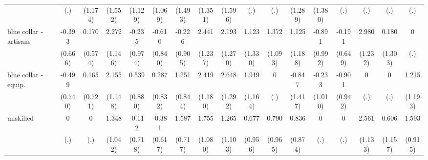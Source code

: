 {\begin{tabular}{l*{16}{c}}
                    &         (.)         &     (1.174)         &     (1.552)         &     (1.129)         &     (1.069)         &     (1.493)         &     (1.351)         &     (1.596)         &         (.)         &         (.)         &     (1.289)         &     (1.380)         &         (.)         &         (.)         &         (.)         &         (.)         \\
[1em]
blue collar - artisans&      -0.393         &       0.170         &       2.272\sym{*}  &      -0.235         &      -0.610         &      -0.226         &       2.441\sym{*}  &       2.193         &       1.123         &       1.372         &       1.125         &      -0.891         &      -0.191         &       2.980\sym{*}  &       0.180         &           0         \\
                    &     (0.666)         &     (0.574)         &     (1.146)         &     (0.974)         &     (0.840)         &     (0.905)         &     (1.237)         &     (1.270)         &     (1.330)         &     (1.093)         &     (1.188)         &     (0.992)         &     (0.649)         &     (1.232)         &     (1.303)         &         (.)         \\
[1em]
blue collar - equip.&      -0.499         &       0.165         &       2.155         &       0.539         &       0.287         &       1.251         &       2.419\sym{*}  &       2.648\sym{*}  &       1.919         &           0         &      -0.847         &      -0.233         &      -0.901         &           0         &           0         &       1.215         \\
                    &     (0.740)         &     (0.721)         &     (1.148)         &     (0.880)         &     (0.832)         &     (0.844)         &     (1.180)         &     (1.292)         &     (1.164)         &         (.)         &     (1.417)         &     (1.010)         &     (0.942)         &         (.)         &         (.)         &     (1.193)         \\
[1em]
unskilled           &           0         &           0         &       1.348         &      -0.112         &      -0.381         &       1.587\sym{*}  &       1.755         &       1.265         &       0.677         &       0.790         &       0.836         &           0         &           0         &       2.561\sym{*}  &       0.606         &       1.593         \\
                    &         (.)         &         (.)         &     (1.042)         &     (0.718)         &     (0.617)         &     (0.717)         &     (1.080)         &     (1.103)         &     (0.956)         &     (0.965)         &     (0.874)         &         (.)         &         (.)         &     (1.133)         &     (1.157)         &     (0.915)         \\

\end{tabular}}
